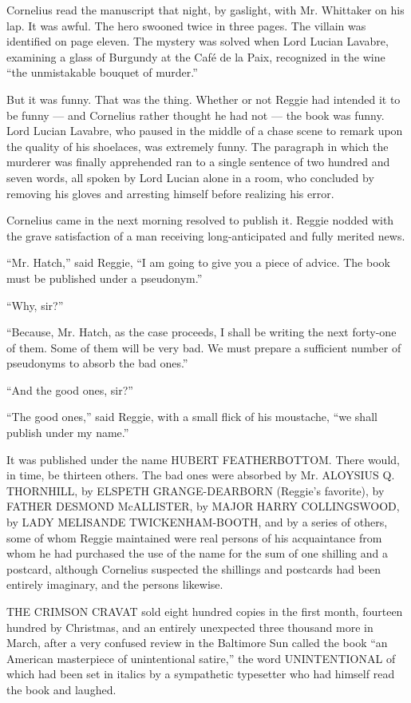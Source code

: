 \documentclass[12pt,openright]{book}
\begin{document}
Cornelius read the manuscript that night, by gaslight, with Mr. Whittaker on his lap. It was awful. The hero swooned twice in three pages. The villain was identified on page eleven. The mystery was solved when Lord Lucian Lavabre, examining a glass of Burgundy at the Café de la Paix, recognized in the wine “the unmistakable bouquet of murder.”

But it was funny. That was the thing. Whether or not Reggie had intended it to be funny — and Cornelius rather thought he had not — the book was funny. Lord Lucian Lavabre, who paused in the middle of a chase scene to remark upon the quality of his shoelaces, was extremely funny. The paragraph in which the murderer was finally apprehended ran to a single sentence of two hundred and seven words, all spoken by Lord Lucian alone in a room, who concluded by removing his gloves and arresting himself before realizing his error.

Cornelius came in the next morning resolved to publish it. Reggie nodded with the grave satisfaction of a man receiving long-anticipated and fully merited news.

“Mr. Hatch,” said Reggie, “I am going to give you a piece of advice. The book must be published under a pseudonym.”

“Why, sir?”

“Because, Mr. Hatch, as the case proceeds, I shall be writing the next forty-one of them. Some of them will be very bad. We must prepare a sufficient number of pseudonyms to absorb the bad ones.”

“And the good ones, sir?”

“The good ones,” said Reggie, with a small flick of his moustache, “we shall publish under my name.”

It was published under the name HUBERT FEATHERBOTTOM. There would, in time, be thirteen others. The bad ones were absorbed by Mr. ALOYSIUS Q. THORNHILL, by ELSPETH GRANGE-DEARBORN (Reggie’s favorite), by FATHER DESMOND McALLISTER, by MAJOR HARRY COLLINGSWOOD, by LADY MELISANDE TWICKENHAM-BOOTH, and by a series of others, some of whom Reggie maintained were real persons of his acquaintance from whom he had purchased the use of the name for the sum of one shilling and a postcard, although Cornelius suspected the shillings and postcards had been entirely imaginary, and the persons likewise.

THE CRIMSON CRAVAT sold eight hundred copies in the first month, fourteen hundred by Christmas, and an entirely unexpected three thousand more in March, after a very confused review in the Baltimore Sun called the book “an American masterpiece of unintentional satire,” the word UNINTENTIONAL of which had been set in italics by a sympathetic typesetter who had himself read the book and laughed.
\end{document}

